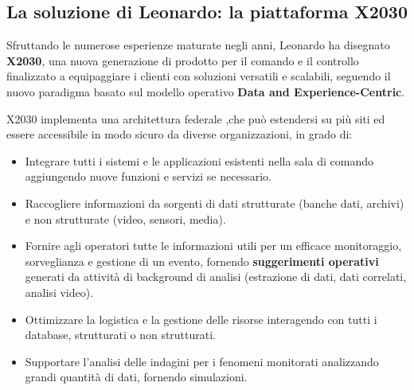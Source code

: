 \subsection{La soluzione di Leonardo: la piattaforma X2030}
Sfruttando le numerose esperienze maturate negli anni,
Leonardo ha disegnato \textbf{X2030}, una nuova generazione
di prodotto per il comando e il controllo finalizzato a equipaggiare
i clienti con soluzioni versatili e scalabili, seguendo il nuovo paradigma
basato sul modello operativo  \textbf{Data and Experience-Centric}.



X2030 implementa una
architettura federale ,che può estendersi su più siti ed essere
accessibile in modo sicuro da diverse organizzazioni, in grado di:
\begin{itemize}

    \item Integrare tutti i sistemi e le applicazioni esistenti nella sala di comando
     aggiungendo nuove funzioni e servizi se
    necessario.
    \item Raccogliere informazioni da sorgenti di dati strutturate (banche dati,
    archivi) e non strutturate (video, sensori,
    media).
    \item Fornire agli operatori tutte le informazioni utili
     per un efficace
    monitoraggio, sorveglianza e gestione di un evento,
    fornendo \textbf{suggerimenti operativi} generati da
    attività di background di analisi (estrazione di dati, dati
    correlati, analisi video).
    \item Ottimizzare la logistica e la gestione delle risorse interagendo con
    tutti i database, strutturati o non strutturati.
    \item Supportare l'analisi delle indagini per i 
    fenomeni monitorati analizzando grandi quantità di dati,
    fornendo simulazioni.

\end{itemize}


